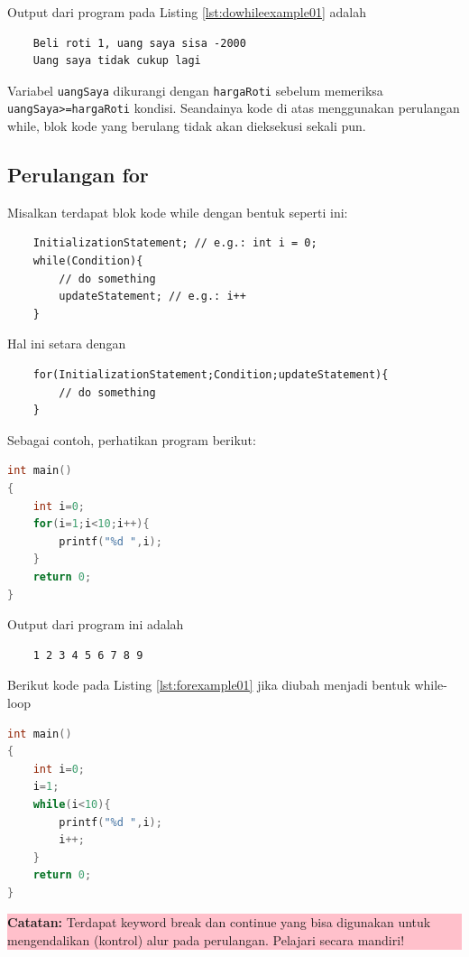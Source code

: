 Output dari program pada Listing \ref{lst:dowhileexample01} adalah
\begin{verbatim}
    Beli roti 1, uang saya sisa -2000
    Uang saya tidak cukup lagi
\end{verbatim}
Variabel \verb|uangSaya| dikurangi dengan \verb|hargaRoti| sebelum memeriksa \verb|uangSaya>=hargaRoti| kondisi.
Seandainya kode di atas menggunakan perulangan while, blok kode yang berulang tidak akan dieksekusi sekali pun.
\subsection{Perulangan for}
Misalkan terdapat blok kode while dengan bentuk seperti ini:
\begin{verbatim}
    InitializationStatement; // e.g.: int i = 0;
    while(Condition){
        // do something
        updateStatement; // e.g.: i++ 
    }
\end{verbatim}
Hal ini setara dengan
\begin{verbatim}
    for(InitializationStatement;Condition;updateStatement){
        // do something
    }
\end{verbatim}

Sebagai contoh, perhatikan program berikut:
\begin{lstlisting}[language=c,caption = Contoh Penggunaan for,label=lst:forexample01]
int main()
{
    int i=0;
    for(i=1;i<10;i++){
        printf("%d ",i);
    }
	return 0;
}
\end{lstlisting}
Output dari program ini adalah
\begin{verbatim}
    1 2 3 4 5 6 7 8 9 
\end{verbatim}
Berikut kode pada Listing \ref{lst:forexample01} jika diubah menjadi bentuk while-loop
\begin{lstlisting}[language=c,caption = For dalam bentuk while,label=lst:forwhileform01]
int main()
{
    int i=0;
    i=1;
    while(i<10){
        printf("%d ",i);
        i++;
    }
	return 0;
}
\end{lstlisting}
\begin{center}
	\colorbox{pink}{\parbox{0.8\linewidth}{\textbf{Catatan:} Terdapat keyword break dan continue yang bisa digunakan untuk mengendalikan (kontrol) alur pada perulangan. Pelajari secara mandiri!}}
\end{center}

